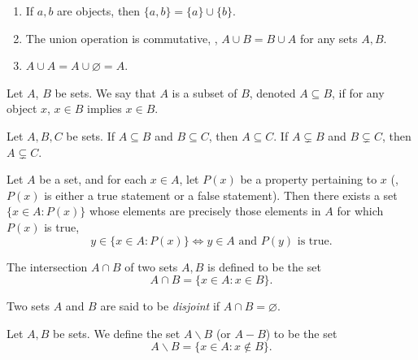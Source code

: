\begin{prop}
\begin{enumerate}
    \item If $a, b$ are objects, then $\{a, b\} = \{a\} \cup \{b\}$. 
    \item The union operation is commutative, \ie, $A \cup B = B \cup A$ 
    for any sets $A, B$. 
    \item $A \cup A = A \cup \varnothing = A$.
\end{enumerate}
\end{prop}

\begin{defn}[Subsets]
Let $A$, $B$ be sets. 
We say that $A$ is a subset of $B$, denoted $A \subseteq B$, if for any object 
$x$, $x \in B$ implies $x \in B$. 
\end{defn}

\begin{prop}
Let $A, B, C$ be sets. 
If $A \subseteq B$ and $B \subseteq C$, then $A \subseteq C$. 
If $A \subsetneq B$ and $B \subsetneq C$, then $A \subsetneq C$. 
\end{prop}

\begin{axiom}[Specification]
Let $A$ be a set, and for each $x \in A$, let $P(x)$ be a property 
pertaining to $x$ (\ie, $P(x)$ is either a true statement or a false 
statement). 
Then there exists a set $\{x \in A: P(x)\}$ whose elements are precisely 
those elements in $A$ for which $P(x)$ is true, \ie 
\begin{equation*}
    y \in \{x \in A: P(x)\} \iff y \in A \text{ and } P(y) \text{ is true}.
\end{equation*}
\end{axiom}

\begin{defn}[Intersection]
The intersection $A \cap B$ of two sets $A, B$ is defined to be the set 
\begin{equation*}
    A \cap B = \{x \in A: x \in B\}. 
\end{equation*}
\end{defn}

\begin{defn}
Two sets $A$ and $B$ are said to be \emph{disjoint} if $A \cap B = 
\varnothing$. 
\end{defn}

\begin{defn}
Let $A, B$ be sets. 
We define the set $A \backslash B$ (or $A - B$) to be the set
\begin{equation*}
    A \backslash B = \{x \in A: x \notin B\}. 
\end{equation*}
\end{defn}

